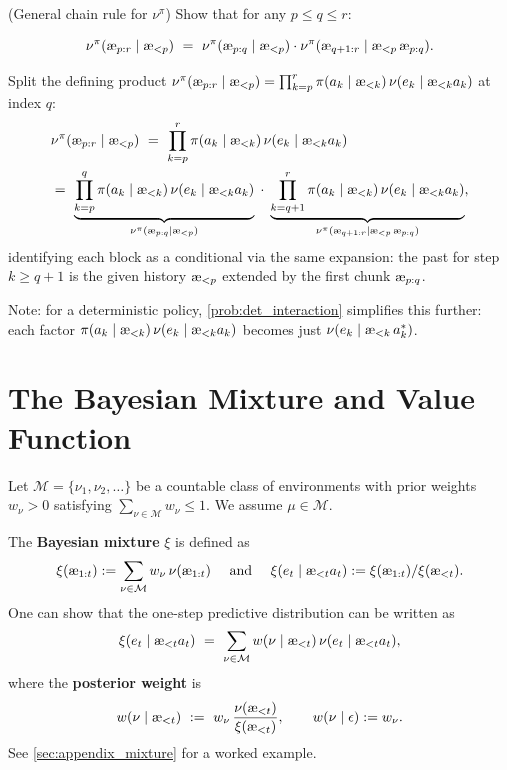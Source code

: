 \documentclass[fontsize=11pt, parskip=half]{scrartcl}
\newcommand{\cM}{\mathcal{M}}
\newcommand{\aes}{\textnormal{\ae}}
\begin{document}
\begin{exercise}
\label{prob:chain_rule_nupi}
(General chain rule for $\nu^\pi$)
Show that for any $p \leq q \leq r$:

\[
    \nu^\pi(\aes_{p:r} \mid \aes_{<p}) ~=~ \nu^\pi(\aes_{p:q} \mid \aes_{<p}) \cdot \nu^\pi(\aes_{q+1:r} \mid \aes_{<p}\, \aes_{p:q}).
\]
\end{exercise}

\begin{solution}
Split the defining product $\nu^\pi(\aes_{p:r} \mid \aes_{<p}) = \prod_{k=p}^r \pi(a_k \mid \aes_{<k})\, \nu(e_k \mid \aes_{<k} a_k)$ at index $q$:
\begin{align*}
    &\nu^\pi(\aes_{p:r} \mid \aes_{<p})
    ~=~ \prod_{k=p}^r \pi(a_k \mid \aes_{<k})\, \nu(e_k \mid \aes_{<k} a_k)\\
    &=~ \underbrace{\prod_{k=p}^{q} \pi(a_k \mid \aes_{<k})\, \nu(e_k \mid \aes_{<k} a_k)}_{\nu^\pi(\aes_{p:q} \mid \aes_{<p})}
    \;\cdot\; \underbrace{\prod_{k=q+1}^{r} \pi(a_k \mid \aes_{<k})\, \nu(e_k \mid \aes_{<k} a_k)}_{\nu^\pi(\aes_{q+1:r} \mid \aes_{<p}\, \aes_{p:q})},
\end{align*}
identifying each block as a conditional via the same expansion: the past for step $k \geq q+1$ is the given history $\aes_{<p}$ extended by the first chunk $\aes_{p:q}$.

Note: for a deterministic policy, \cref{prob:det_interaction} simplifies this further: each factor $\pi(a_k \mid \aes_{<k})\, \nu(e_k \mid \aes_{<k} a_k)$ becomes just $\nu(e_k \mid \aes_{<k}\, a^*_k)$.
\end{solution}


\section*{The Bayesian Mixture and Value Function}

\begin{definition}\label{def:mixture}
Let $\cM = \{\nu_1, \nu_2, \ldots\}$ be a countable class of environments with prior weights $w_\nu > 0$ satisfying $\sum_{\nu \in \cM} w_\nu \leq 1$.
We assume $\mu \in \cM$.

The \textbf{Bayesian mixture} $\xi$ is defined as 
$$
\xi(\aes_{1:t}) := \sum_{\nu \in \cM} w_\nu\, \nu(\aes_{1:t}) \quad \text{ and } \quad \xi(e_t \mid \aes_{<t} a_t) := \xi(\aes_{1:t}) / \xi(\aes_{<t}).
$$
One can show that the one-step predictive distribution can be written as
\[
    \xi(e_t \mid \aes_{<t} a_t)
    ~=~ \sum_{\nu \in \cM} w(\nu \mid \aes_{<t})\, \nu(e_t \mid \aes_{<t} a_t),
\]
where the \textbf{posterior weight} is
\[
    w(\nu \mid \aes_{<t})
    ~:=~ w_\nu \,\frac{\nu(\aes_{<t})}{\xi(\aes_{<t})},
    \qquad w(\nu \mid \epsilon) := w_\nu.
\]
See \cref{sec:appendix_mixture} for a worked example.
\end{definition}
\end{document}

